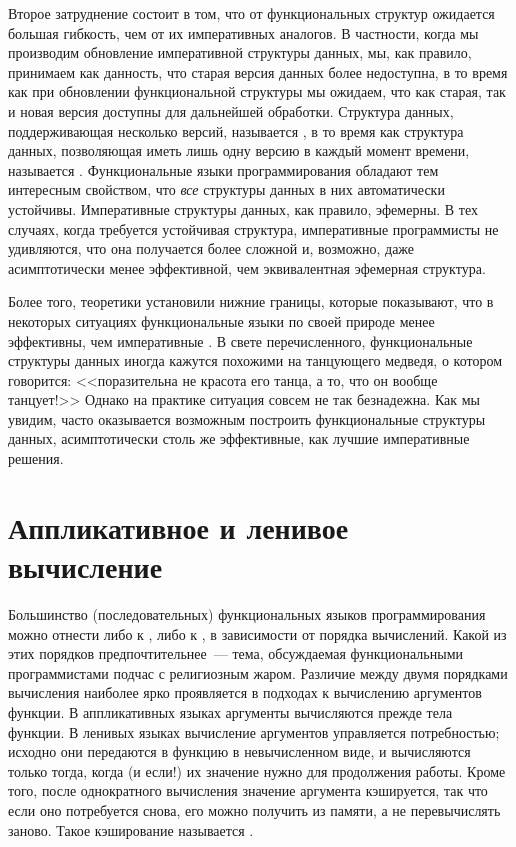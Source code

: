 Второе затруднение состоит в том, что от функциональных структур
ожидается большая гибкость, чем от их императивных аналогов.  В
частности, когда мы производим обновление императивной структуры
данных, мы, как правило, принимаем как данность, что старая версия
данных более недоступна, в то время как при обновлении функциональной
структуры мы ожидаем, что как старая, так и новая версия доступны для
дальнейшей обработки. Структура данных, поддерживающая несколько
версий, называется , в то время как
структура данных, позволяющая иметь лишь одну версию в каждый момент
времени, называется 
\cite{DSST1989}. Функциональные языки программирования обладают тем
интересным свойством, что \emph{все} структуры данных в них
автоматически устойчивы. Императивные структуры данных, как правило,
эфемерны. В тех случаях, когда требуется устойчивая структура,
императивные программисты не удивляются, что она получается более
сложной и, возможно, даже асимптотически менее эффективной, чем
эквивалентная эфемерная структура.

Более того, теоретики установили нижние границы, которые показывают,
что в некоторых ситуациях функциональные языки по своей природе менее
эффективны, чем императивные \cite{BAG1992, Pippenger1996}.  В свете
перечисленного, функциональные структуры данных иногда кажутся
похожими на танцующего медведя, о котором говорится: <<поразительна не
красота его танца, а то, что он вообще
танцует!>> Однако на практике ситуация совсем не так безнадежна. Как
мы увидим, часто оказывается возможным построить функциональные
структуры данных, асимптотически столь же эффективные, как лучшие
императивные решения.

\section{Аппликативное и ленивое вычисление}

Большинство (последовательных) функциональных языков программирования
можно отнести либо к , либо к
, в зависимости от порядка вычислений.  Какой из
этих порядков предпочтительнее~--- тема, обсуждаемая функциональными
программистами подчас с религиозным жаром.  Различие между двумя
порядками вычисления наиболее ярко проявляется в подходах к вычислению
аргументов функции. В аппликативных языках аргументы вычисляются
прежде тела функции. В ленивых языках вычисление аргументов управляется
потребностью; исходно они передаются в функцию в невычисленном виде, и
вычисляются только тогда, когда (и если!) их значение нужно
для продолжения работы.  Кроме того, после однократного вычисления
значение аргумента кэшируется, так что если оно потребуется снова, его
можно получить из памяти, а не перевычислять заново.  Такое
кэширование называется 
\cite{Michie1968}.

